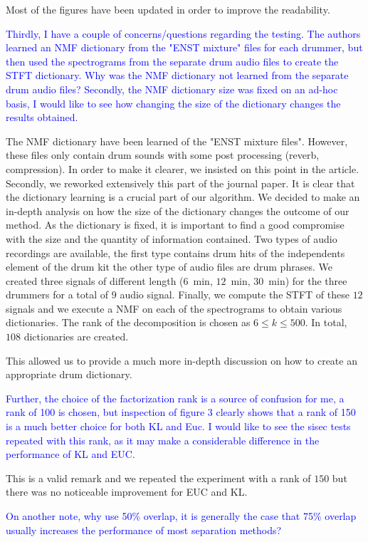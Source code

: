 \documentclass[]{article}
\begin{document}
Most of the figures have been updated in order to improve the readability. 

\textcolor{blue}{Thirdly, I have a couple of concerns/questions regarding the testing. The authors learned an NMF dictionary from the "ENST mixture" files for each drummer, but then used the spectrograms from the separate drum audio files to create the STFT dictionary. Why was the NMF dictionary not learned from the separate drum audio files? Secondly, the NMF dictionary size was fixed on an ad-hoc basis, I would like to see how changing the size of the dictionary changes the results obtained.}

The NMF dictionary have been learned of the "ENST mixture files". However, these files only contain drum sounds with some post processing (reverb, compression). In order to make it clearer, we insisted on this point in the article. 
Secondly, we reworked extensively this part of the journal paper. It is clear that the dictionary learning is a crucial part of our algorithm. We decided to make an in-depth analysis on how the size of the dictionary changes the outcome of our method.
As the dictionary is fixed, it is important to find a good compromise with the size and the quantity of information contained. 
Two types of audio recordings are available, the first type contains drum hits of the independents element of the drum kit the other type of audio files are drum phrases. We created three signals of different length ($6$~min, $12$~min, $30$~min) for the three drummers for a total of $9$ audio signal. 
Finally, we compute the STFT of these $12$ signals and we execute a NMF on each of the spectrograms to obtain various dictionaries. The rank of the decomposition is chosen as $6 \le k  \le 500$. In total, $108$ dictionaries are created. 

This allowed us to provide a much more in-depth discussion on how to create an appropriate drum dictionary.   


\textcolor{blue}{Further, the choice of the factorization rank is a source of confusion for me, a rank of 100 is chosen, but inspection of figure 3 clearly shows that a rank of 150 is a much better choice for both KL and Euc. I would like to see the sisec tests repeated with this rank, as it may make a considerable difference in the performance of KL and EUC.}

This is a valid remark and we repeated the experiment with a rank of $150$ but there was no noticeable improvement for EUC and KL. 

\textcolor{blue}{On another note, why use 50\% overlap, it is generally the case that 75\% overlap usually increases the performance of most separation methods?}
\end{document}
